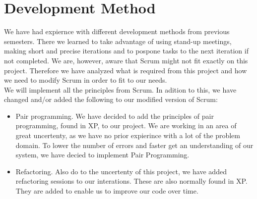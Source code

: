 \section{Development Method}
We have had expiernce with different development methods from previous semesters.
There we learned to take advantage of using stand-up meetings, making short and precise iterations and to pospone tasks to the next iteration if not completed. 
We are, however, aware that Scrum might not fit exactly on this project.
Therefore we have analyzed what is required from this project and how we need to modify Scrum in order to fit to our needs. \\

We will implement all the principles from Scrum. In adition to this, we have changed and/or added the following to our modified version of Scrum:
\begin{itemize}
	\item Pair programming. We have decided to add the principles of pair programming, found in XP, to our project. We are working in an area of great uncertenty, as we have no prior expierince with a lot of the problem domain. To lower the number of errors and faster get an understanding of our system, we have decied to implement Pair Programming.
	\item Refactoring. Also do to the uncertenty of this project, we have added refactoring sessions to our interations. These are also normally found in XP. They are added to enable us to improve our code over time. 
\end{itemize}



